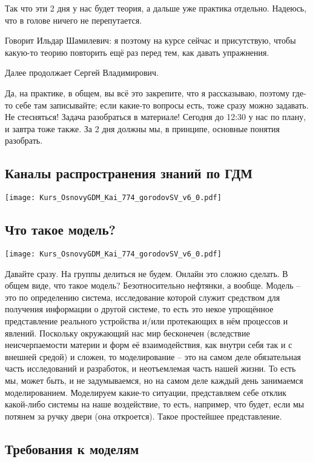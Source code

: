 \documentclass[main.tex]{subfiles}
\begin{document}
Так что эти 2 дня у нас будет теория, а дальше уже практика отдельно.
Надеюсь, что в голове ничего не перепутается.

Говорит Ильдар Шамилевич: я поэтому на курсе сейчас и присутствую, чтобы какую-то теорию повторить ещё раз перед тем, как давать упражнения.

Далее продолжает Сергей Владимирович.

Да, на практике, в общем, вы всё это закрепите, что я рассказываю, поэтому где-то себе там записывайте; если какие-то вопросы есть, тоже сразу можно задавать.
Не стесняться!
Задача разобраться в материале!
Сегодня до 12:30 у нас по плану, и завтра тоже также.
За 2 дня должны мы, в принципе, основные понятия разобрать.

\subsection{Каналы распространения знаний по ГДМ}

\texttt{[image: Kurs\_OsnovyGDM\_Kai\_774\_gorodovSV\_v6\_0.pdf]}

\subsection{Что такое модель?}

\texttt{[image: Kurs\_OsnovyGDM\_Kai\_774\_gorodovSV\_v6\_0.pdf]}

Давайте сразу. На группы делиться не будем. Онлайн это сложно сделать.
В общем виде, что такое модель? Безотносительно нефтянки, а вообще. 
Модель -- это по определению система, исследование которой служит средством для получения информации о другой системе, то есть это некое упрощённое представление реального устройства и/или протекающих в нём процессов и явлений.
Поскольку окружающий нас мир бесконечен (вследствие неисчерпаемости материи и форм её взаимодействия, как внутри себя так и с внешней средой) и сложен, то моделирование -- это на самом деле обязательная часть исследований и разработок, и неотъемлемая часть нашей жизни.
То есть мы, может быть, и не задумываемся, но на самом деле каждый день занимаемся моделированием.
Моделируем какие-то ситуации, представляем себе отклик какой-либо системы на наше воздействие, то есть, например, что будет, если мы потянем за ручку двери (она откроется).
Такое простейшее представление.

\subsection{Требования к моделям}
\end{document}
